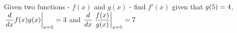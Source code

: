 
%
%
%
%      
% 
% 
%   



\SQUARE\vbtwo\tp
\gcalcexpr[0]\tq{\vbfour * \tp}
\ADD\tq\vbthree\tr
\MULTIPLY{}\ts

\question Given two functions - $f(x)$ and $g(x)$ - find $f'(x)$ given that 
$g(5) = 4$, $\left.\dfrac{d}{dx} f(x)g(x)\right\vert_{x=5} = 3$ and 
$\dfrac{d}{dx}\left.\dfrac{f(x)}{g(x)}\right\vert_{x=5} = 7$

